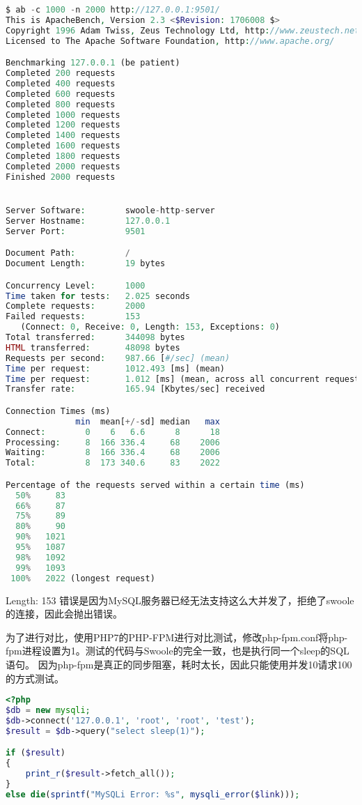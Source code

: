\begin{lstlisting}[language=PHP]
$ ab -c 1000 -n 2000 http://127.0.0.1:9501/
This is ApacheBench, Version 2.3 <$Revision: 1706008 $>
Copyright 1996 Adam Twiss, Zeus Technology Ltd, http://www.zeustech.net/
Licensed to The Apache Software Foundation, http://www.apache.org/

Benchmarking 127.0.0.1 (be patient)
Completed 200 requests
Completed 400 requests
Completed 600 requests
Completed 800 requests
Completed 1000 requests
Completed 1200 requests
Completed 1400 requests
Completed 1600 requests
Completed 1800 requests
Completed 2000 requests
Finished 2000 requests


Server Software:        swoole-http-server
Server Hostname:        127.0.0.1
Server Port:            9501

Document Path:          /
Document Length:        19 bytes

Concurrency Level:      1000
Time taken for tests:   2.025 seconds
Complete requests:      2000
Failed requests:        153
   (Connect: 0, Receive: 0, Length: 153, Exceptions: 0)
Total transferred:      344098 bytes
HTML transferred:       48098 bytes
Requests per second:    987.66 [#/sec] (mean)
Time per request:       1012.493 [ms] (mean)
Time per request:       1.012 [ms] (mean, across all concurrent requests)
Transfer rate:          165.94 [Kbytes/sec] received

Connection Times (ms)
              min  mean[+/-sd] median   max
Connect:        0    6   6.6      8      18
Processing:     8  166 336.4     68    2006
Waiting:        8  166 336.4     68    2006
Total:          8  173 340.6     83    2022

Percentage of the requests served within a certain time (ms)
  50%     83
  66%     87
  75%     89
  80%     90
  90%   1021
  95%   1087
  98%   1092
  99%   1093
 100%   2022 (longest request)
\end{lstlisting}

Length: 153 错误是因为MySQL服务器已经无法支持这么大并发了，拒绝了swoole的连接，因此会抛出错误。

为了进行对比，使用PHP7的PHP-FPM进行对比测试，修改php-fpm.conf将php-fpm进程设置为1。测试的代码与Swoole的完全一致，也是执行同一个sleep的SQL语句。 因为php-fpm是真正的同步阻塞，耗时太长，因此只能使用并发10请求100的方式测试。




\begin{lstlisting}[language=PHP]
<?php
$db = new mysqli;
$db->connect('127.0.0.1', 'root', 'root', 'test');
$result = $db->query("select sleep(1)");

if ($result) 
{
    print_r($result->fetch_all());
}
else die(sprintf("MySQLi Error: %s", mysqli_error($link)));
\end{lstlisting}


